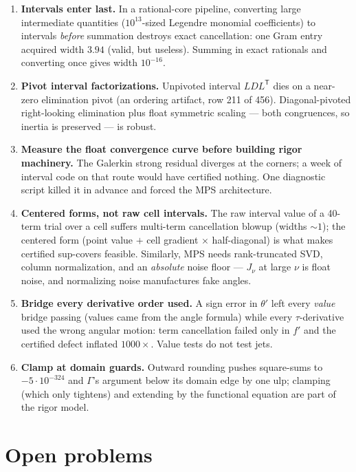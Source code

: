 \documentclass[11pt]{article}
\begin{document}
\begin{enumerate}
\item \textbf{Intervals enter last.} In a rational-core pipeline,
converting large intermediate quantities ($10^{13}$-sized Legendre
monomial coefficients) to intervals \emph{before} summation destroys
exact cancellation: one Gram entry acquired width $3.94$ (valid, but
useless). Summing in exact rationals and converting once gives width
$10^{-16}$.
\item \textbf{Pivot interval factorizations.} Unpivoted interval
$LDL^{\mathsf T}$ dies on a near-zero elimination pivot (an ordering
artifact, row 211 of 456). Diagonal-pivoted right-looking elimination
plus float symmetric scaling --- both congruences, so inertia is
preserved --- is robust.
\item \textbf{Measure the float convergence curve before building rigor
machinery.} The Galerkin strong residual diverges at the corners; a
week of interval code on that route would have certified nothing. One
diagnostic script killed it in advance and forced the MPS architecture.
\item \textbf{Centered forms, not raw cell intervals.} The raw interval
value of a 40-term trial over a cell suffers multi-term cancellation
blowup (widths ${\sim}1$); the centered form (point value $+$ cell
gradient $\times$ half-diagonal) is what makes certified sup-covers
feasible. Similarly, MPS needs rank-truncated SVD, column
normalization, and an \emph{absolute} noise floor --- $J_\nu$ at large
$\nu$ is float noise, and normalizing noise manufactures fake angles.
\item \textbf{Bridge every derivative order used.} A sign error in
$\theta'$ left every \emph{value} bridge passing (values came from the
angle formula) while every $\tau$-derivative used the wrong angular
motion: term cancellation failed only in $f'$ and the certified defect
inflated $1000\times$. Value tests do not test jets.
\item \textbf{Clamp at domain guards.} Outward rounding pushes
square-sums to $-5\cdot10^{-324}$ and $\Gamma$'s argument below its
domain edge by one ulp; clamping (which only tightens) and extending by
the functional equation are part of the rigor model.
\end{enumerate}

\section{Open problems}\label{sec:open}
\end{document}

